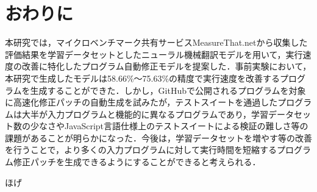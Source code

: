 \documentclass[submit,ses,noauthor]{ipsj}
\begin{document}
\section{おわりに}\label{sec:conclusion}

本研究では，マイクロベンチマーク共有サービスMeasureThat.netから収集した評価結果を学習データセットとしたニューラル機械翻訳モデルを用いて，実行速度の改善に特化したプログラム自動修正モデルを提案した．事前実験において，本研究で生成したモデルは58.66\%〜75.63\%の精度で実行速度を改善するプログラムを生成することができた．しかし，GitHubで公開されるプログラムを対象に高速化修正パッチの自動生成を試みたが，テストスイートを通過したプログラムは大半が入力プログラムと機能的に異なるプログラムであり，学習データセット数の少なさやJavaScript言語仕様上のテストスイートによる検証の難しさ等の課題があることが明らかになった．今後は，学習データセットを増やす等の改善を行うことで，より多くの入力プログラムに対して実行時間を短縮するプログラム修正パッチを生成できるようにすることができると考えられる．







\begin{acknowledgment}
ほげ
\end{acknowledgment}






\end{document}
